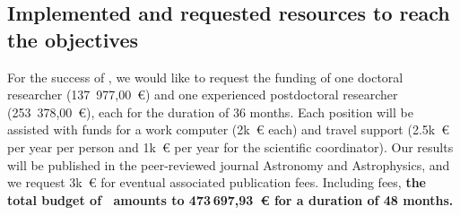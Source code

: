 






\subsection{Implemented and requested resources to reach the objectives}

For the success of \projacro, we would like to request the funding of
one doctoral researcher (137~977,00~€) and one experienced postdoctoral researcher (253~378,00~€), 
each for the duration of 36 months. 
Each position will be assisted with funds for a work computer (2k~€ each)
and travel support (2.5k~€ per year per person and 1k~€ per year for the scientific coordinator).
Our results will be published in the peer-reviewed journal Astronomy and Astrophysics, 
and we request 3k~€ for eventual associated publication fees. 
Including fees, \textbf{the total budget of \projacro\ amounts to 473 697,93~€ for a duration of 48 months.}



